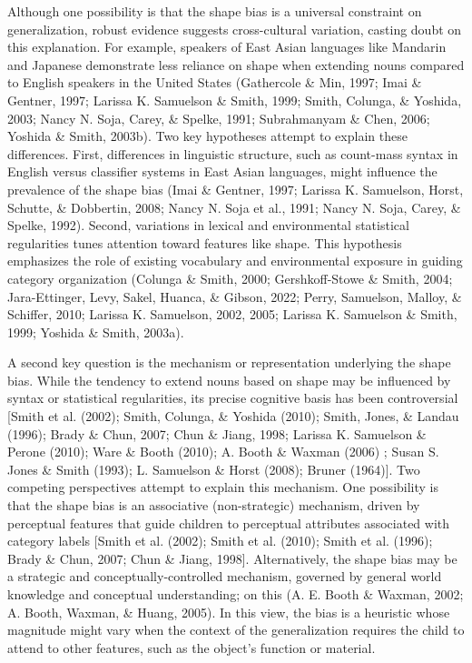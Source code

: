 \documentclass[10pt, letterpaper]{article}
\begin{document}
Although one possibility is that the shape bias is a universal
constraint on generalization, robust evidence suggests cross-cultural
variation, casting doubt on this explanation. For example, speakers of
East Asian languages like Mandarin and Japanese demonstrate less
reliance on shape when extending nouns compared to English speakers in
the United States (Gathercole \& Min, 1997; Imai \& Gentner, 1997;
Larissa K. Samuelson \& Smith, 1999; Smith, Colunga, \& Yoshida, 2003;
Nancy N. Soja, Carey, \& Spelke, 1991; Subrahmanyam \& Chen, 2006;
Yoshida \& Smith, 2003b). Two key hypotheses attempt to explain these
differences. First, differences in linguistic structure, such as
count-mass syntax in English versus classifier systems in East Asian
languages, might influence the prevalence of the shape bias (Imai \&
Gentner, 1997; Larissa K. Samuelson, Horst, Schutte, \& Dobbertin, 2008;
Nancy N. Soja et al., 1991; Nancy N. Soja, Carey, \& Spelke, 1992).
Second, variations in lexical and environmental statistical regularities
tunes attention toward features like shape. This hypothesis emphasizes
the role of existing vocabulary and environmental exposure in guiding
category organization (Colunga \& Smith, 2000; Gershkoff-Stowe \& Smith,
2004; Jara-Ettinger, Levy, Sakel, Huanca, \& Gibson, 2022; Perry,
Samuelson, Malloy, \& Schiffer, 2010; Larissa K. Samuelson, 2002, 2005;
Larissa K. Samuelson \& Smith, 1999; Yoshida \& Smith, 2003a).

A second key question is the mechanism or representation underlying the
shape bias. While the tendency to extend nouns based on shape may be
influenced by syntax or statistical regularities, its precise cognitive
basis has been controversial {[}Smith et al. (2002); Smith, Colunga, \&
Yoshida (2010); Smith, Jones, \& Landau (1996); Brady \& Chun, 2007;
Chun \& Jiang, 1998; Larissa K. Samuelson \& Perone (2010); Ware \&
Booth (2010); A. Booth \& Waxman (2006) ; Susan S. Jones \& Smith
(1993); L. Samuelson \& Horst (2008); Bruner (1964){]}. Two competing
perspectives attempt to explain this mechanism. One possibility is that
the shape bias is an associative (non-strategic) mechanism, driven by
perceptual features that guide children to perceptual attributes
associated with category labels {[}Smith et al. (2002); Smith et al.
(2010); Smith et al. (1996); Brady \& Chun, 2007; Chun \& Jiang,
1998{]}. Alternatively, the shape bias may be a strategic and
conceptually-controlled mechanism, governed by general world knowledge
and conceptual understanding; on this (A. E. Booth \& Waxman, 2002; A.
Booth, Waxman, \& Huang, 2005). In this view, the bias is a heuristic
whose magnitude might vary when the context of the generalization
requires the child to attend to other features, such as the object's
function or material.
\end{document}
